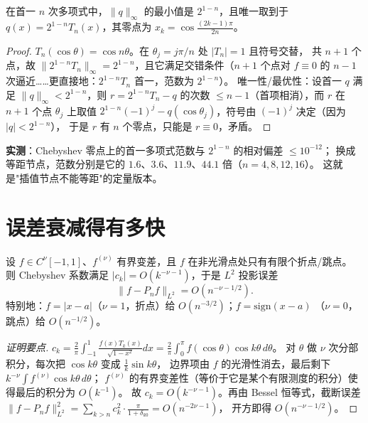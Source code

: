 \begin{theorem}
\label{thm:monic}
在首一 $n$ 次多项式中，$\|q\|_\infty$ 的最小值是 $2^{1-n}$，且唯一取到于
$q(x)=2^{1-n}T_n(x)$，其零点为 $x_k=\cos\frac{(2k-1)\pi}{2n}$。
\end{theorem}

\begin{proof}
$T_n(\cos\theta)=\cos n\theta$。在 $\theta_j=j\pi/n$ 处 $|T_n|=1$ 且符号交替，
共 $n+1$ 个点，故 $\|2^{1-n}T_n\|_\infty=2^{1-n}$，且它满足交错条件（$n+1$ 个点对
$f\equiv0$ 的 $n-1$ 次逼近……更直接地：$2^{1-n}T_n$ 首一，范数为 $2^{1-n}$）。
唯一性/最优性：设首一 $q$ 满足 $\|q\|_\infty<2^{1-n}$，则 $r=2^{1-n}T_n-q$ 的次数
$\le n-1$（首项相消），而 $r$ 在 $n+1$ 个点 $\theta_j$ 上取值
$2^{1-n}(-1)^j-q(\cos\theta_j)$，符号由 $(-1)^j$ 决定（因为 $|q|<2^{1-n}$），
于是 $r$ 有 $n$ 个零点，只能是 $r\equiv0$，矛盾。
\end{proof}

\textbf{实测}：Chebyshev 零点上的首一多项式范数与 $2^{1-n}$ 的相对偏差 $\le10^{-12}$；
换成等距节点，范数分别是它的 $1.6$、$3.6$、$11.9$、$44.1$ 倍（$n=4,8,12,16$）。
这就是"插值节点不能等距"的定量版本。

\section{误差衰减得有多快}

\begin{theorem}[代数收敛率]
\label{thm:algebraic}
设 $f\in C^\nu[-1,1]$、$f^{(\nu)}$ 有界变差，且 $f$ 在非光滑点处只有有限个折点/跳点。
则 Chebyshev 系数满足 $|c_k|=O(k^{-\nu-1})$，于是 $L^2$ 投影误差
\[
  \|f-P_nf\|_{L^2}=O(n^{-\nu-1/2}).
\]
特别地：$f=|x-a|$（$\nu=1$，折点）给 $O(n^{-3/2})$；$f=\mathrm{sign}(x-a)$
（$\nu=0$，跳点）给 $O(n^{-1/2})$。
\end{theorem}

\begin{proof}[证明要点]
$c_k=\frac{2}{\pi}\int_{-1}^1\frac{f(x)T_k(x)}{\sqrt{1-x^2}}dx=\frac{2}{\pi}\int_0^\pi f(\cos\theta)\cos k\theta\,d\theta$。
对 $\theta$ 做 $\nu$ 次分部积分，每次把 $\cos k\theta$ 变成 $\frac{1}{k}\sin k\theta$，
边界项由 $f$ 的光滑性消去，最后剩下 $k^{-\nu}\int f^{(\nu)}\cos k\theta\,d\theta$；
$f^{(\nu)}$ 的有界变差性（等价于它是某个有限测度的积分）使得最后的积分为 $O(k^{-1})$。
故 $c_k=O(k^{-\nu-1})$。再由 Bessel 恒等式，截断误差
$\|f-P_nf\|_{L^2}^2=\sum_{k>n}c_k^2\cdot\frac{\pi}{1+\delta_{k0}}=O(n^{-2\nu-1})$，
开方即得 $O(n^{-\nu-1/2})$。
\end{proof}

